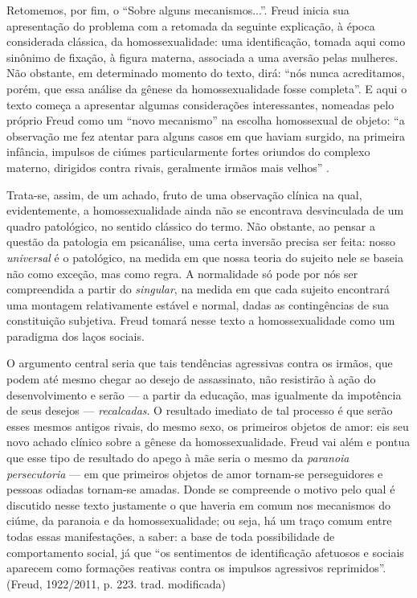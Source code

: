 Retomemos, por fim, o ``Sobre alguns mecanismos...''. Freud inicia sua
apresentação do problema com a retomada da seguinte explicação, à época
considerada clássica, da homossexualidade: uma identificação, tomada
aqui como sinônimo de fixação, à figura materna, associada a uma aversão
pelas mulheres. Não obstante, em determinado momento do texto, dirá:
``nós nunca acreditamos, porém, que essa análise da gênese da
homossexualidade fosse completa''. E aqui o texto começa a apresentar
algumas considerações interessantes, nomeadas pelo próprio Freud como um
``novo mecanismo'' na escolha homossexual de objeto: ``a observação me
fez atentar para alguns casos em que haviam surgido, na primeira
infância, impulsos de ciúmes particularmente fortes oriundos do complexo
materno, dirigidos contra rivais, geralmente irmãos mais velhos'' .

Trata-se, assim, de um achado, fruto de uma observação clínica na qual,
evidentemente, a homossexualidade ainda não se encontrava desvinculada
de um quadro patológico, no sentido clássico do termo. Não obstante, ao
pensar a questão da patologia em psicanálise, uma certa inversão precisa
ser feita: nosso \emph{universal} é o patológico, na medida em que nossa
teoria do sujeito nele se baseia não como exceção, mas como regra. A
normalidade só pode por nós ser compreendida a partir do
\emph{singular}, na medida em que cada sujeito encontrará uma montagem
relativamente estável e normal, dadas as contingências de sua
constituição subjetiva. Freud tomará nesse texto a homossexualidade como
um paradigma dos laços sociais.

O argumento central seria que tais tendências agressivas contra os
irmãos, que podem até mesmo chegar ao desejo de assassinato, não
resistirão à ação do desenvolvimento e serão --- a partir da educação,
mas igualmente da impotência de seus desejos --- \emph{recalcadas}. O
resultado imediato de tal processo é que serão esses mesmos antigos
rivais, do mesmo sexo, os primeiros objetos de amor: eis seu novo achado
clínico sobre a gênese da homossexualidade. Freud vai além e pontua que
esse tipo de resultado do apego à mãe seria o mesmo da \emph{paranoia
persecutoria} --- em que primeiros objetos de amor tornam-se
perseguidores e pessoas odiadas tornam-se amadas. Donde se compreende o
motivo pelo qual é discutido nesse texto justamente o que haveria em
comum nos mecanismos do ciúme, da paranoia e da homossexualidade; ou
seja, há um traço comum entre todas essas manifestações, a saber: a base
de toda possibilidade de comportamento social, já que ``os sentimentos
de identificação afetuosos e sociais aparecem como formações reativas
contra os impulsos agressivos reprimidos''. (Freud, 1922/2011, p. 223.
trad. modificada)


